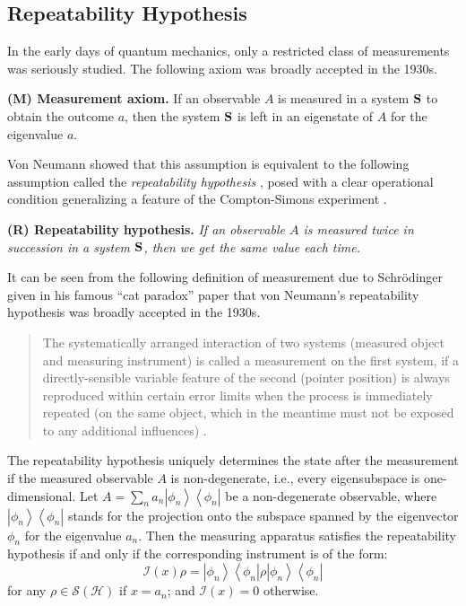 \documentclass[12pt]{article}
\newcommand{\beq}{\begin{equation}}
\newcommand{\eeq}{\end{equation}}
\newcommand{\bS}{{\bf S}}
\newcommand{\cH}{{\mathcal H}}
\newcommand{\cI}{{\mathcal I}}
\newcommand{\cS}{{\mathcal S}}
\newcommand{\ph}{\phi}
\newcommand{\rh}{\rho}
\newcommand{\bra}[1]{\left\langle#1\right|}
\newcommand{\ket}[1]{\left|#1\right\rangle}
\newcommand{\ketbra}[1]{\ket{#1}\!\!\bra{#1}}
\begin{document}
\subsection{Repeatability Hypothesis}

In the early days of quantum mechanics,
only a restricted class of measurements was seriously studied.
The following axiom was broadly accepted in the 1930s.
\bigskip

{\bf (M) Measurement axiom.}
If an observable $A$ is measured in a system $\bS$ to obtain the outcome $a$, 
then the system $\bS$ is left in an eigenstate of $A$ for the eigenvalue $a$.
\bigskip

Von Neumann \cite{vN32E} showed that this assumption is equivalent to the following
assumption called the {\em repeatability hypothesis} \cite[p.~335]{vN32E}, 
posed with a clear operational condition generalizing a feature of the Compton-Simons 
experiment \cite[pp.~212--214]{vN32E}. 
\bigskip

{\bf (R) Repeatability hypothesis.}
{\em If an observable $A$ is measured twice in succession 
in a system $\bS$, then we get the same value each time.}
\bigskip

It can be seen from the following definition of measurement due to Schr\"{o}dinger
given in his famous ``cat paradox'' paper \cite{Sch35} that 
von Neumann's repeatability hypothesis was broadly accepted in the 1930s.


\begin{quote}
The systematically arranged interaction of two systems (measured object and 
measuring instrument) is called a measurement on the first system, if a directly-sensible variable
feature of the second (pointer position) is always reproduced within certain error limits when the
process is immediately repeated (on the same object, which in the meantime must not be exposed 
to any additional influences) \cite{Sch35}.
\end{quote}

The repeatability hypothesis uniquely determines the state 
after the measurement if the measured observable $A$ is non-degenerate, i.e., 
every eigensubspace is one-dimensional.
Let $A=\sum_{n}a_n\ketbra{\ph_n}$ be a non-degenerate observable,
where $\ketbra{\ph_n}$ stands for the projection onto the subspace spanned by
the eigenvector $\ph_n$ for the eigenvalue $a_n$.
Then the measuring apparatus satisfies the repeatability hypothesis
if and only if the corresponding instrument is of the form:
\beq
\cI(x)\rh=\ketbra{\ph_n}\rh\ketbra{\ph_n}
\eeq
for any $\rh\in\cS(\cH)$ if $x=a_n$; and $\cI(x)=0$ otherwise.
\end{document}
